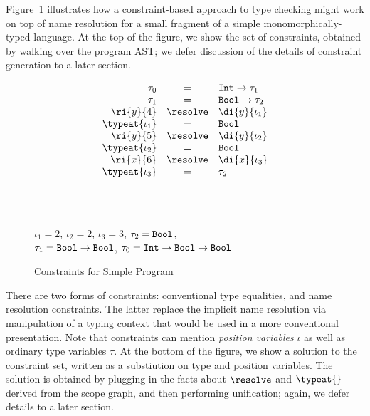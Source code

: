 Figure~\ref{fig:simple-constraints} illustrates how a constraint-based approach to
type checking might work on top of name resolution for a small fragment
of a simple monomorphically-typed language. At the top of the figure,
we show the set of constraints, obtained by walking over the program AST; 
we defer discussion of the details of constraint generation to a later section.
\begin{figure}[tb]
\begin{boxedminipage}{\hsize}
\[
\begin{array}{rcl}
\tau_0 & = & \mbox{\tt Int} \rightarrow \tau_1  \\
\tau_1 & = & \mbox{\tt Bool} \rightarrow \tau_2  \\
\ri{y}{4} & \resolve & \di{y}{\iota_1} \\
\typeat{\iota_1} & = & \mbox{\tt Bool}\\
\ri{y}{5} & \resolve & \di{y}{\iota_2} \\
\typeat{\iota_2} & = & \mbox{\tt Bool} \\
\ri{x}{6} & \resolve & \di{x}{\iota_3} \\
\typeat{\iota_3} & = & \tau_2\\
\end{array}
\]
\end{boxedminipage}
\\
\begin{boxedminipage}{\hsize}
\\
$\iota_1 = 2$, $\iota_2 = 2$, $\iota_3 = 3$,
$\tau_2 = \mbox{\tt Bool}$,\\
$\tau_1 = \mbox{\tt Bool} \rightarrow \mbox{\tt Bool}$,
$\tau_0 = \mbox{\tt Int} \rightarrow \mbox{\tt Bool} \rightarrow \mbox{\tt Bool}$
\end{boxedminipage}
\caption{Constraints for Simple Program}
\label{fig:simple-constraints}
\end{figure}
There are two forms of constraints: conventional type equalities,
and name resolution constraints.  The latter replace the implicit
name resolution via manipulation of a typing context that would 
be used in a more conventional presentation.
Note that constraints can
mention {\em position variables} $\iota$ as well as ordinary type variables $\tau$. At the bottom of the figure, we show a solution to the constraint
set, written as a substiution on type and position variables. The solution
is obtained by plugging in the facts about $\resolve$ and $\typeat{}$ derived
from the scope graph, and then performing unification; again, we defer details
to a later section.

